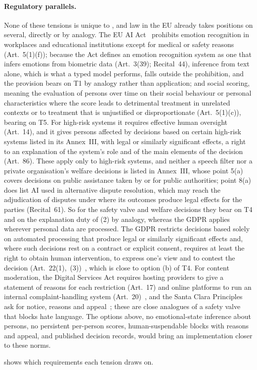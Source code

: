 \paragraph{Regulatory parallels.}
None of these tensions is unique to \pol{}, and law in the EU already takes positions on several, directly or by analogy.
The EU AI Act~\cite{euaiact2024} prohibits emotion recognition in workplaces and educational institutions except for medical or safety reasons (Art.~5(1)(f)); because the Act defines an emotion recognition system as one that infers emotions from biometric data (Art.~3(39); Recital~44), inference from text alone, which is what a typed model performs, falls outside the prohibition, and the provision bears on T1 by analogy rather than application; and social scoring, meaning the evaluation of persons over time on their social behaviour or personal characteristics where the score leads to detrimental treatment in unrelated contexts or to treatment that is unjustified or disproportionate (Art.~5(1)(c)), bearing on T5.
For high-risk systems it requires effective human oversight (Art.~14), and it gives persons affected by decisions based on certain high-risk systems listed in its Annex~III, with legal or similarly significant effects, a right to an explanation of the system's role and of the main elements of the decision (Art.~86). These apply only to high-risk systems, and neither a speech filter nor a private organisation's welfare decisions is listed in Annex~III, whose point 5(a) covers decisions on public assistance taken by or for public authorities; point 8(a) does list AI used in alternative dispute resolution, which may reach the adjudication of disputes under  where its outcomes produce legal effects for the parties (Recital~61). So for the safety valve and welfare decisions they bear on T4 and on the explanation duty of (2) by analogy, whereas the GDPR applies wherever personal data are processed.
The GDPR restricts decisions based solely on automated processing that produce legal or similarly significant effects and, where such decisions rest on a contract or explicit consent, requires at least the right to obtain human intervention, to express one's view and to contest the decision (Art.~22(1),~(3))~\cite{gdpr2016}, which is close to option (b) of T4.
For content moderation, the Digital Services Act requires hosting providers to give a statement of reasons for each restriction (Art.~17) and online platforms to run an internal complaint-handling system (Art.~20)~\cite{dsa2022}, and the Santa Clara Principles ask for notice, reasons and appeal~\cite{santaclara2021}; these are close analogues of a safety valve that blocks hate language.
The options above, no emotional-state inference about persons, no persistent per-person scores, human-suspendable blocks with reasons and appeal, and published decision records, would bring an implementation closer to these norms.

 shows which requirements each tension draws on.
